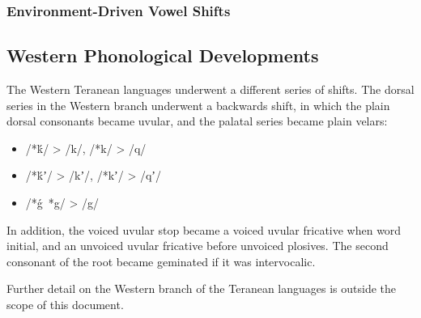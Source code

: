 \documentclass[grammar]{subfiles}
\begin{document}
\subsubsection{Environment-Driven Vowel Shifts}
\label{sssec:history:east:vowel_shifts}

\Tbw
 
\subsection{Western Phonological Developments}
\label{ssec:history:western_developments}

The Western Teranean languages underwent a different series of shifts.  The
dorsal series in the Western branch underwent a backwards shift, in which the
plain dorsal consonants became uvular, and the palatal series became plain
velars: 

\begin{itemize}
  \item /*ḱ/ > /k/, /*k/ > /q/
  \item /*ḱʼ/ > /kʼ/, /*kʼ/ > /qʼ/
  \item /*ǵ~*g/ > /g/
\end{itemize}

In addition, the voiced uvular stop became a voiced uvular fricative when word
initial, and an unvoiced uvular fricative before unvoiced plosives.  The second
consonant of the root became geminated if it was intervocalic.

Further detail on the Western branch of the Teranean languages is outside the
scope of this document.

%


%
\end{document}
